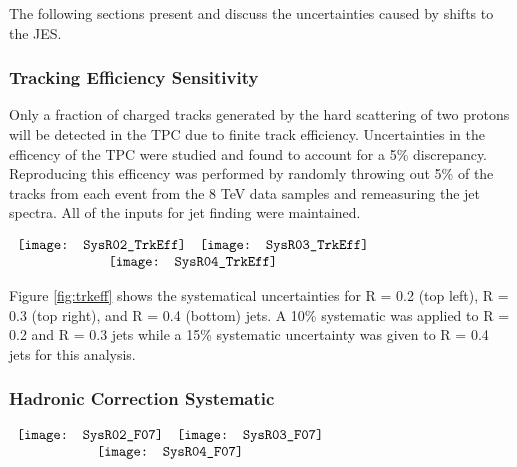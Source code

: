 The following sections present and discuss the uncertainties caused by shifts to the JES.

\subsubsection{Tracking Efficiency Sensitivity}
Only a fraction of charged tracks generated by the hard scattering of two protons will be detected in the TPC due to finite track efficiency.  Uncertainties in the efficency of the TPC were studied and found to account for a 5\% discrepancy\cite{Abelev:2013ala}.  Reproducing this efficency was performed by randomly throwing out 5\% of the tracks from each event from the 8 TeV data samples and remeasuring the jet spectra.  All of the inputs for jet finding were maintained.


\begin{figure*}[t!]
$\begin{array}{rl}
    \texttt{[image: SysR02\_TrkEff]} &
    \texttt{[image: SysR03\_TrkEff]}\\
    \multicolumn{2}{c}{\texttt{[image: SysR04\_TrkEff]}}
\end{array}$
\caption[Systematic due to TPC tracking efficiency.]{\label{fig:trkeff}Systematic due to TPC tracking efficiency; R = 0.2 \textit{(top left)}, R = 0.3 \textit{(top right)}, R = 0.4 \textit{(bottom)}.}
\end{figure*}

\noindent
Figure \ref{fig:trkeff} shows the systematical uncertainties for R = 0.2 (top left), R = 0.3 (top right), and R = 0.4 (bottom) jets.  A 10\% systematic was applied to R = 0.2 and R = 0.3 jets while a 15\% systematic uncertainty was given to R = 0.4 jets for this analysis.

\subsubsection{Hadronic Correction Systematic}

\begin{figure*}[t!]
$\begin{array}{rl}
    \texttt{[image: SysR02\_F07]} &
    \texttt{[image: SysR03\_F07]}\\
    \multicolumn{2}{c}{\texttt{[image: SysR04\_F07]}}
\end{array}$
\caption[Systematic due to Hadronic correction.]{\label{fig:hadeff}Systematic due to hadronic correction efficiency; R = 0.2 \textit{(top left)}, R = 0.3 \textit{(top right)}, R = 0.4 \textit{(bottom)}.}
\end{figure*}

